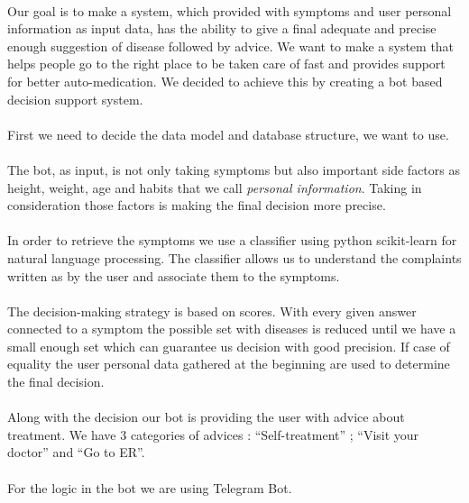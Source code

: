 	\paragraph{} 
	Our goal is to make a system, which provided with symptoms and user personal information as input data, has the ability to give a final adequate and precise enough suggestion of disease followed by advice. We want to make a system that helps people go to the right place to be taken care of fast and provides support for better auto-medication.
	We decided to achieve this by creating a bot based decision support system.
	\paragraph{}
	First we need to decide the data model and database structure, we want to use.
	\paragraph{}
	The bot, as input, is not only taking symptoms but also important side factors as height, weight, age and habits that we call \textit{personal information}. Taking in consideration those factors is making the final decision more precise. 
	\paragraph{}
	In order to retrieve the symptoms we use a classifier using python scikit-learn for natural language processing. The classifier allows us to understand the complaints written as by the user and associate them to the symptoms.
	\paragraph{}
	The decision-making strategy is based on scores. With every given answer connected to a symptom the possible set with diseases is reduced until we have a small enough set which can guarantee us decision with good precision. If case of equality the user personal data gathered at the beginning are used to determine the final decision. 
	\paragraph{}
	Along with the decision our bot is providing the user with advice about treatment. We have 3 categories of advices :
	“Self-treatment” ; “Visit your doctor” and “Go to ER”. 
	\paragraph{}
	For the logic in the bot we are using Telegram Bot. 
	
